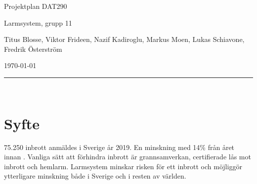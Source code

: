 \documentclass[a4paper]{article}
\newcommand\namn{Larmsystem}
\begin{document}
%
%

\thispagestyle{empty}

\begin{center}
    \parskip=14pt%
    \vspace*{3\parskip}%

    {\LARGE Projektplan DAT290}

    {\large \namn, grupp 11

    Titus Blosse, Viktor Frideen, Nazif Kadiroglu, Markus Moen, Lukas Schiavone, Fredrik Österström

    \today}

    \rule{7cm}{0.4pt}\\
\end{center}
\newpage

%
%

\thispagestyle{empty}

\tableofcontents
\newpage

%
%


\section{Syfte}

75.250 inbrott anmäldes i Sverige år 2019. En minskning med 14\% från året innan \cite{brastold}. Vanliga sätt att förhindra inbrott är grannsamverkan, certifierade lås mot inbrott och hemlarm. Larmsystem minskar risken för ett inbrott och möjliggör ytterligare minskning både i Sverige och i resten av världen. %


\end{document}
